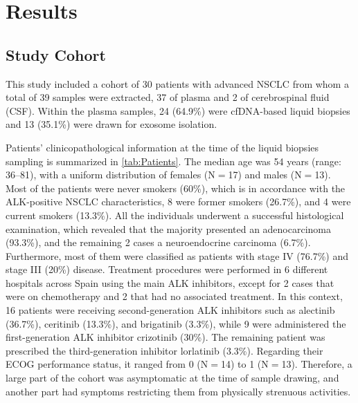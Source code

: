 \chapter{Results}

\section{Study Cohort}

This study included a cohort of 30 patients with advanced NSCLC from whom a total of 39 samples were extracted, 37 of plasma and 2 of cerebrospinal fluid (CSF). Within the plasma samples, 24 (64.9\%) were cfDNA-based liquid biopsies and 13 (35.1\%) were drawn for exosome isolation.

Patients' clinicopathological information at the time of the liquid biopsies sampling is summarized in \autoref{tab:Patients}. The median age was 54 years (range: 36–81), with a uniform distribution of females (N$=$17) and males (N$=$13). Most of the patients were never smokers (60\%), which is in accordance with the ALK-positive NSCLC characteristics, 8 were former smokers (26.7\%), and 4 were current smokers (13.3\%). All the individuals underwent a successful histological examination, which revealed that the majority presented an adenocarcinoma (93.3\%), and the remaining 2 cases a neuroendocrine carcinoma (6.7\%). Furthermore, most of them were classified as patients with stage IV (76.7\%) and stage III (20\%) disease. Treatment procedures were performed in 6 different hospitals across Spain using the main ALK inhibitors, except for 2 cases that were on chemotherapy and 2 that had no associated treatment. In this context, 16 patients were receiving second-generation ALK inhibitors such as alectinib (36.7\%), ceritinib (13.3\%), and brigatinib (3.3\%), while 9 were administered the first-generation ALK inhibitor crizotinib (30\%). The remaining patient was prescribed the third-generation inhibitor lorlatinib (3.3\%). Regarding their ECOG performance status, it ranged from 0 (N$=$14) to 1 (N$=$13). Therefore, a large part of the cohort was asymptomatic at the time of sample drawing, and another part had symptoms restricting them from physically strenuous activities.

